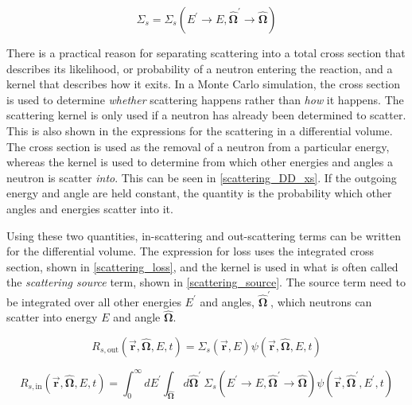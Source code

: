 \begin{equation}
\label{scattering_DD_xs}
\Sigma_s = \Sigma_s(E^\prime \rightarrow E,\boldsymbol{\hat{\Omega}}^\prime \rightarrow \boldsymbol{\hat{\Omega}})
 \end{equation}

There is a practical reason for separating scattering into a total cross section that describes its likelihood, or probability of a neutron entering the reaction, and a kernel that describes how it exits.  In a Monte Carlo simulation, the cross section is used to determine \emph{whether} scattering happens rather than \emph{how} it happens.  The scattering kernel is only used if a neutron has already been determined to scatter.  This is also shown in the expressions for the scattering in a differential volume.  The cross section is used as the removal of a neutron from a particular energy, whereas the kernel is used to determine from which other energies and angles a neutron is scatter \emph{into}.  This can be seen in \eqref{scattering_DD_xs}.  If the outgoing energy and angle are held constant, the quantity is the probability which other angles and energies scatter into it.

Using these two quantities, in-scattering and out-scattering terms can be written for the differential volume.  The expression for loss uses the integrated cross section, shown in \eqref{scattering_loss}, and the kernel is used in what is often called the \emph{scattering source} term, shown in \eqref{scattering_source}.  The source term need to be integrated over all other energies $E^\prime$ and angles, $\boldsymbol{\hat{\Omega}}^\prime$, which neutrons can scatter into energy $E$ and angle $\boldsymbol{\hat{\Omega}}$.

\begin{equation}
\label{scattering_loss}
R_{s, \mathrm{out}}( \boldsymbol{\vec{r}},\boldsymbol{\hat{\Omega}},E,t ) = \Sigma_s (\boldsymbol{\vec{r}},E) \psi(\boldsymbol{\vec{r}},\boldsymbol{\hat{\Omega}},E,t)
 \end{equation}
 
 \begin{equation}
\label{scattering_source}
R_{s, \mathrm{in}}(\boldsymbol{\vec{r}},\boldsymbol{\hat{\Omega}},E,t) = \int_0^\infty dE^\prime \int_{\boldsymbol{\hat{\Omega}}} d\boldsymbol{\hat{\Omega}}^\prime \: \Sigma_s(E^\prime \rightarrow E,\boldsymbol{\hat{\Omega}}^\prime \rightarrow \boldsymbol{\hat{\Omega}}) \psi(\boldsymbol{\vec{r}},\boldsymbol{\hat{\Omega}}^\prime,E^\prime,t)  
 \end{equation}
 
